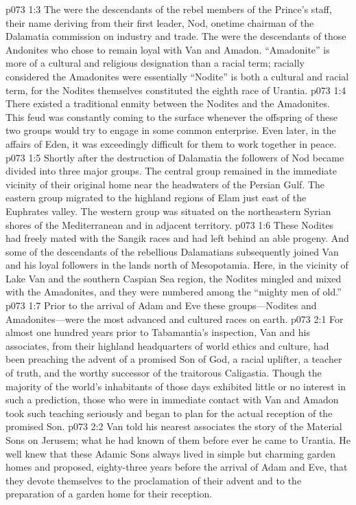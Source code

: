 \vs p073 1:3 The  were the descendants of the rebel members of the Prince’s staff, their name deriving from their first leader, Nod, onetime chairman of the Dalamatia commission on industry and trade. The  were the descendants of those Andonites who chose to remain loyal with Van and Amadon. “Amadonite” is more of a cultural and religious designation than a racial term; racially considered the Amadonites were essentially  “Nodite” is both a cultural and racial term, for the Nodites themselves constituted the eighth race of Urantia.
\vs p073 1:4 There existed a traditional enmity between the Nodites and the Amadonites. This feud was constantly coming to the surface whenever the offspring of these two groups would try to engage in some common enterprise. Even later, in the affairs of Eden, it was exceedingly difficult for them to work together in peace.
\vs p073 1:5 Shortly after the destruction of Dalamatia the followers of Nod became divided into three major groups. The central group remained in the immediate vicinity of their original home near the headwaters of the Persian Gulf. The eastern group migrated to the highland regions of Elam just east of the Euphrates valley. The western group was situated on the northeastern Syrian shores of the Mediterranean and in adjacent territory.
\vs p073 1:6 These Nodites had freely mated with the Sangik races and had left behind an able progeny. And some of the descendants of the rebellious Dalamatians subsequently joined Van and his loyal followers in the lands north of Mesopotamia. Here, in the vicinity of Lake Van and the southern Caspian Sea region, the Nodites mingled and mixed with the Amadonites, and they were numbered among the “mighty men of old.”
\vs p073 1:7 Prior to the arrival of Adam and Eve these groups---Nodites and Amadonites---were the most advanced and cultured races on earth.\plusone
{}
\vs p073 2:1 For almost one hundred years prior to Tabamantia’s inspection, Van and his associates, from their highland headquarters of world ethics and culture, had been preaching the advent of a promised Son of God, a racial uplifter, a teacher of truth, and the worthy successor of the traitorous Caligastia. Though the majority of the world’s inhabitants of those days exhibited little or no interest in such a prediction, those who were in immediate contact with Van and Amadon took such teaching seriously and began to plan for the actual reception of the promised Son.
\vs p073 2:2 Van told his nearest associates the story of the Material Sons on Jerusem; what he had known of them before ever he came to Urantia. He well knew that these Adamic Sons always lived in simple but charming garden homes and proposed, eighty\hyp{}three years before the arrival of Adam and Eve, that they devote themselves to the proclamation of their advent and to the preparation of a garden home for their reception.
